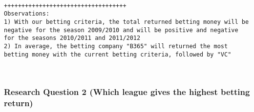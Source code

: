 \documentclass[11pt]{article}
\begin{document}
    
    \begin{center}
    \end{center}
    { \hspace*{\fill} \\}
    
    \begin{center}
    \end{center}
    { \hspace*{\fill} \\}
    
    \begin{center}
    \end{center}
    { \hspace*{\fill} \\}
    
    \begin{Verbatim}[commandchars=\\\{\}]
+++++++++++++++++++++++++++++++++++
Observations: 
1) With our betting criteria, the total returned betting money will be negative for the season 2009/2010 and will be positive and negative for the seasons 2010/2011 and 2011/2012
2) In average, the betting company "B365" will returned the most betting money with the current betting criteria, followed by "VC"



    \end{Verbatim}

    \hypertarget{research-question-2-which-league-gives-the-highest-betting-return}{%
\subsubsection{Research Question 2 (Which league gives the highest
betting
return)}\label{research-question-2-which-league-gives-the-highest-betting-return}}
\end{document}
